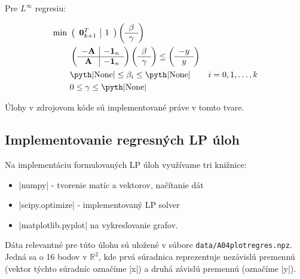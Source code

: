\documentclass[report.tex]{subfiles}
\begin{document}
Pre $L^{\infty}$ regresiu:

\begin{align*}
	\text{min}~ &
	\left(
	\begin{array}{c|c}
		\mathbf{0}_{k+1}^T & 1
	\end{array}
	\right)
	\left(
	\begin{array}{c}
		\beta \\
		\hline
		\gamma
	\end{array}
	\right) \\
	&\left(
	\begin{array}{c|c}
		-\mathbf{A} & -\mathbf{1}_n \\
		\hline
		\mathbf{A} & -\mathbf{1}_n
	\end{array}
	\right)
	\left(
	\begin{array}{c}
		\beta \\
		\hline
		\gamma
	\end{array}
	\right)
	\leq
	\left(
	\begin{array}{c}
		-y \\
		\hline
		y
	\end{array}
	\right) \\
	&\text{\pyth|None|} \leq \beta_i \leq \text{\pyth|None|} &i = 0,1,\dots,k\\
	&0 \leq \gamma \leq \text{\pyth|None|}
\end{align*}

Úlohy v zdrojovom kóde sú implementované práve v tomto tvare.

\subsection{Implementovanie regresných LP úloh}

Na implementáciu formulovaných LP úloh využívame tri knižnice:

\begin{itemize}
	\item \pyth|numpy| - tvorenie matíc a vektorov, načítanie dát
	\item \pyth|scipy.optimize| - implementovaný LP solver
	\item \pyth|matplotlib.pyplot| na vykresľovanie grafov.
\end{itemize}

Dáta relevantné pre túto úlohu sú uložené v súbore \verb|data/A04plotregres.npz|. Jedná sa o 16 bodov v $\mathbb{R}^2$, kde prvá súradnica reprezentuje nezávislú premennú (vektor týchto súradníc označíme \pyth|x|) a druhá závislú premennú (označíme \pyth|y|). 
\end{document}
